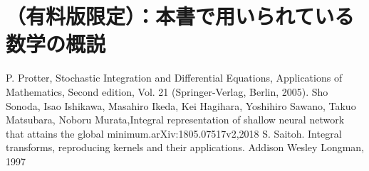 \documentclass{jsarticle}
\begin{document}
\newpage
\section{（有料版限定）：本書で用いられている数学の概説}



\newpage
\newpage
\begin{thebibliography}{99}
    P. Protter, Stochastic Integration and Differential Equations, Applications of Mathematics, Second edition, Vol. 21 (Springer-Verlag, Berlin, 2005).
     Sho Sonoda, Isao Ishikawa, Masahiro Ikeda, Kei Hagihara, Yoshihiro Sawano, Takuo Matsubara, Noboru Murata,Integral representation of shallow neural network that attains the global minimum.arXiv:1805.07517v2,2018
     S. Saitoh. Integral transforms, reproducing kernels and their applications. Addison Wesley Longman, 1997
  
\end{thebibliography}
\end{document}
